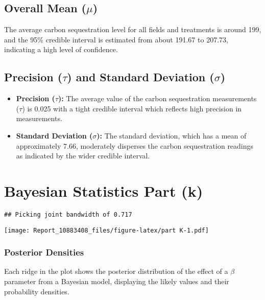 \documentclass[
]{article}
\begin{document}
\subsection{\texorpdfstring{Overall Mean
(\(\mu\))}{Overall Mean (\textbackslash mu)}}\label{overall-mean-mu}

The average carbon sequestration level for all fields and treatments is
around 199, and the 95\% credible interval is estimated from about
191.67 to 207.73, indicating a high level of confidence.

\subsection{\texorpdfstring{Precision (\(\tau\)) and Standard Deviation
(\(\sigma\))}{Precision (\textbackslash tau) and Standard Deviation (\textbackslash sigma)}}\label{precision-tau-and-standard-deviation-sigma}

\begin{itemize}
\item
  \textbf{Precision (\(\tau\)):} The average value of the carbon
  sequestration measurements (\(\tau\)) is 0.025 with a tight credible
  interval which reflects high precision in measurements.
\item
  \textbf{Standard Deviation (\(\sigma\)):} The standard deviation,
  which has a mean of approximately 7.66, moderately disperses the
  carbon sequestration readings as indicated by the wider credible
  interval.
\end{itemize}

\section{Bayesian Statistics Part (k)}\label{bayesian-statistics-part-k}

\begin{verbatim}
## Picking joint bandwidth of 0.717
\end{verbatim}

\texttt{[image: Report\_10883408\_files/figure-latex/part K-1.pdf]}

\subsubsection{Posterior Densities}\label{posterior-densities}

Each ridge in the plot shows the posterior distribution of the effect of
a \(\beta\) parameter from a Bayesian model, displaying the likely
values and their probability densities.
\end{document}
